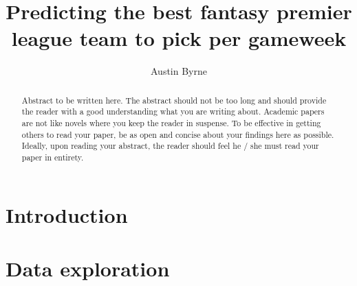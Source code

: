 \documentclass[11pt,preprint, authoryear]{elsarticle}
\numberwithin{equation}{section}
\numberwithin{figure}{section}
\numberwithin{table}{section}
\begin{document}
\begin{frontmatter}  %

\title{Predicting the best fantasy premier league team to pick per
gameweek}





\author[Add1]{Austin Byrne}





\address[Add1]{Stellenbosch University, South Africa}


\begin{abstract}
\small{
Abstract to be written here. The abstract should not be too long and
should provide the reader with a good understanding what you are writing
about. Academic papers are not like novels where you keep the reader in
suspense. To be effective in getting others to read your paper, be as
open and concise about your findings here as possible. Ideally, upon
reading your abstract, the reader should feel he / she must read your
paper in entirety.
}
\end{abstract}

\vspace{1cm}





\vspace{0.5cm}

\end{frontmatter}

\setcounter{footnote}{0}



\pagestyle{fancy}
\chead{}
\rhead{}
\lfoot{}
\lhead{}
\cfoot{}


\headsep 35pt %




\hypertarget{introduction}{%
\section{\texorpdfstring{Introduction
\label{Introduction}}{Introduction }}\label{introduction}}

\hypertarget{data-exploration}{%
\section{Data exploration}\label{data-exploration}}
\end{document}
